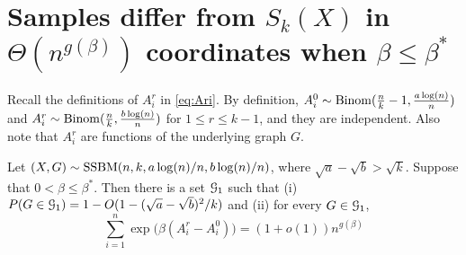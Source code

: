\documentclass{article}
\begin{document}
\section{Samples differ from $S_k(X)$ in $\Theta(n^{g(\beta)})$ coordinates when $\beta\le\beta^\ast$}  \label{sect:struct}
Recall the definitions of $A^r_i$ in \eqref{eq:Ari}.
By definition,
$A^0_i\sim \operatorname{Binom}(\frac{n}{k}-1,\frac{a\log(n)}{n})$ and $A^r_i\sim \operatorname{Binom}(\frac{n}{k}, \frac{b\log(n)}{n})$ for $1\leq r \leq k-1$,
and they are independent.
Also note that $A^r_i$ are functions of the underlying graph $G$.

\begin{proposition}  \label{prop:con}
Let $(X,G)\sim \operatorname{SSBM}(n,k, a\log(n)/n, b\log(n)/n)$, where $\sqrt{a}-\sqrt{b} > \sqrt{k}$.
Suppose that $0< \beta \le \beta^\ast$.
Then there is a set $\mathcal{G}_{1}$ such that (i) $P(G \in \mathcal{G}_{1}) = 1-O({1-(\sqrt{a}-\sqrt{b})^2/k})$ and (ii) for every $G\in \mathcal{G}_{1}$, 
$$
\sum_{i=1}^n \exp\big(\beta (A^r_i-A^0_i) \big)
=(1+o(1)) n^{g(\beta)}
$$
\end{proposition}
\end{document}
